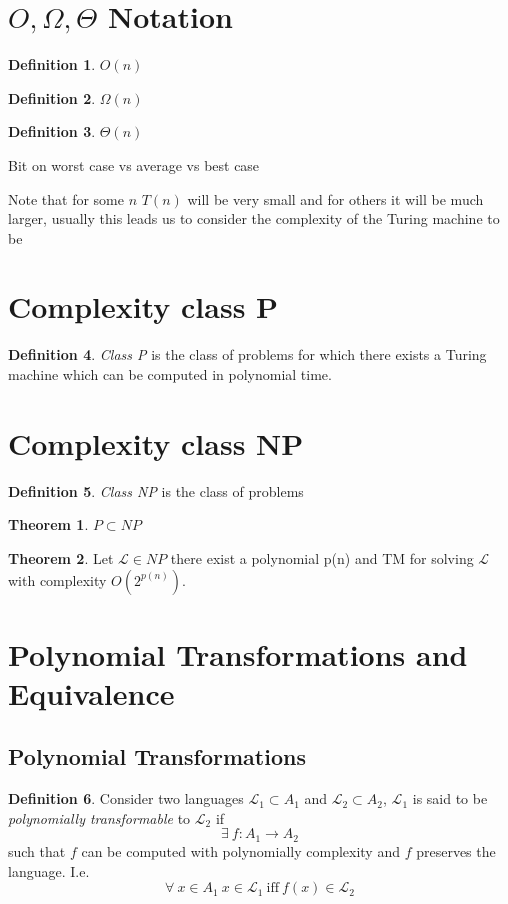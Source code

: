 \documentclass{article}
\theoremstyle{definition}
\newtheorem{definition}{Definition}[section]
\newtheorem{theorem}{Theorem}[section]
\begin{document}
\pagebreak
\section{$O, \Omega, \Theta$ Notation}

\begin{definition}
	$O(n)$
\end{definition}

\begin{definition}
	$\Omega(n)$
\end{definition}

\begin{definition}
	$\Theta(n)$
\end{definition}
Bit on worst case vs average vs best case

Note that for some $n$ $T(n)$ will be very small and for others it will be much larger,
usually this leads us to consider the complexity of the Turing machine to be 


\pagebreak
\section{Complexity class P}
\begin{definition}
	\textit{Class P} is the class of problems for which there exists a Turing machine
	which can be computed in polynomial time.
\end{definition}

\pagebreak
\section{Complexity class NP}
\begin{definition}
	\textit{Class NP} is the class of problems 
\end{definition}

\begin{theorem}
	$P \subset NP$
\end{theorem}

\begin{theorem}
	Let $\mathcal{L} \in NP$ there exist a polynomial p(n) and TM
	for solving $\mathcal{L}$ with complexity $O(2^{p(n)})$.
\end{theorem}

\pagebreak
\section{Polynomial Transformations and Equivalence}
\subsection{Polynomial Transformations}
\begin{definition}
	Consider two languages $\mathcal{L_1} \subset A_1$ and $\mathcal{L_2} \subset A_2$,
	$\mathcal{L_1}$ is said to be \textit{polynomially transformable} to $\mathcal{L_2}$ if
	$$\exists\ f : A_1 \rightarrow A_2$$
	such that $f$ can be computed with polynomially complexity and $f$ preserves the language. I.e.
	$$\forall\ x \in A_1\ x \in \mathcal{L_1}\ \mathrm{iff}\ f(x)\in \mathcal{L_2}$$
\end{definition}
\end{document}
